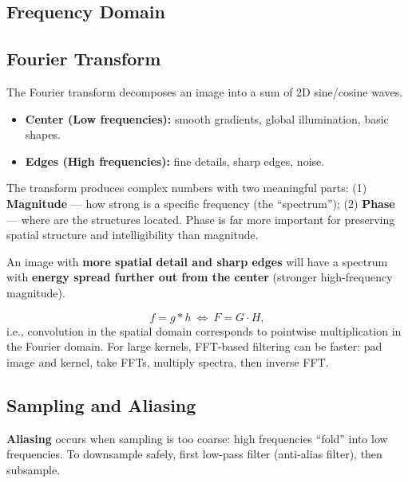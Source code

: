 \documentclass[11pt, oneside]{book}
\begin{document}
\begin{thmbox}[title={Reprojection Error Minimization}]
\begin{defbox}[title={Correlation and Convolution}]
\section{Frequency Domain}

\subsection{Fourier Transform}

\begin{defbox}[title={Fourier Decomposition}]
The Fourier transform decomposes an image into a sum of 2D sine/cosine waves.
\begin{itemize}
  \item \textbf{Center (Low frequencies):} smooth gradients, global illumination, basic shapes.
  \item \textbf{Edges (High frequencies):} fine details, sharp edges, noise.
\end{itemize}
\end{defbox}

The transform produces complex numbers with two meaningful parts:
(1) \textbf{Magnitude} --- how strong is a specific frequency (the ``spectrum'');
(2) \textbf{Phase} --- where are the structures located. Phase is far more important for preserving
spatial structure and intelligibility than magnitude.

An image with \textbf{more spatial detail and sharp edges} will have a spectrum with \textbf{energy spread further out from the center} (stronger high-frequency magnitude).

\begin{thmbox}[title={Convolution Theorem}]
\[
f = g*h\ \Longleftrightarrow\ F = G\cdot H,
\]
i.e., convolution in the spatial domain corresponds to pointwise multiplication in the Fourier domain.
For large kernels, FFT-based filtering can be faster: pad image and kernel, take FFTs, multiply spectra, then inverse FFT.
\end{thmbox}

\subsection{Sampling and Aliasing}

\begin{defbox}[title={Aliasing}]
\textbf{Aliasing} occurs when sampling is too coarse: high frequencies ``fold'' into low frequencies.
To downsample safely, first low-pass filter (anti-alias filter), then subsample.
\end{defbox}


\end{defbox}
\end{thmbox}
\end{document}
